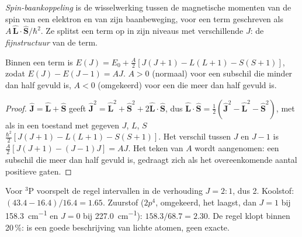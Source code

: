 \begin{definition}\label{def:b3:many-electron-atoms:spin-orbit}
\emph{Spin-baankoppeling} is de wisselwerking
tussen de magnetische momenten van de spin van een elektron en van zijn
baanbeweging, voor een term geschreven als $A\,\hat{\mathbf L}\cdot\hat{\mathbf S}/\hbar^2$. Ze
splitst een term op in zijn niveaus met verschillende $J$: de
\emph{fijnstructuur} van de term.
\end{definition}

\begin{proposition}\label{prop:b3:many-electron-atoms:lande}
Binnen een term is $E(J) = E_0 + \frac{A}{2}[J(J+1) - L(L+1) - S(S+1)]$, zodat
$E(J) - E(J - 1) = AJ$. $A > 0$ (normaal) voor een subschil die minder dan
half gevuld is,
$A < 0$ (omgekeerd) voor een die meer dan half gevuld is.
\end{proposition}

\begin{proof}
$\hat{\mathbf J} = \hat{\mathbf L} + \hat{\mathbf S}$ geeft $\hat{\mathbf J}^2 =
\hat{\mathbf L}^2 + \hat{\mathbf S}^2 + 2\hat{\mathbf L}\cdot\hat{\mathbf S}$, dus
$\hat{\mathbf L}\cdot\hat{\mathbf S} = \frac12(\hat{\mathbf J}^2 - \hat{\mathbf L}^2 -
\hat{\mathbf S}^2)$, met als  in een toestand met gegeven $J$, $L$, $S$
$\frac{\hbar^2}{2}[J(J+1) - L(L+1) - S(S+1)]$. Het verschil tussen $J$ en
$J - 1$ is $\frac A2[J(J+1) - (J-1)J] = AJ$. Het teken van $A$ wordt
aangenomen: een
subschil die meer dan half gevuld is, gedraagt zich als het overeenkomende
aantal positieve gaten.
\end{proof}

\begin{example}\label{ex:b3:many-electron-atoms:lande-test}
Voor ${}^3$P voorspelt de regel intervallen in de verhouding $J = 2 : 1$, dus 2.
Koolstof: $(43.4 - 16.4)/16.4 = 1.65$. Zuurstof ($2p^4$, omgekeerd, 
het laagst, dan $J = 1$ bij \qty{158.3}{cm^{-1}} en $J = 0$ bij \qty{227.0}{cm^{-1}}):
$158.3/68.7 = 2.30$. De regel klopt binnen 20\,\%: 
is een goede beschrijving van lichte atomen, geen exacte.
\end{example}

